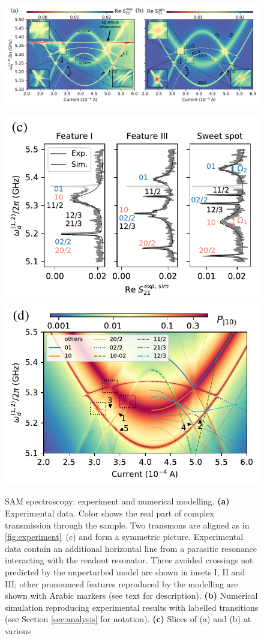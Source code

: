 \documentclass[%
 aps, prx,
 amsmath,amssymb,
 reprint,%
superscriptaddress
]{revtex4-2}
\begin{document}
\begin{figure}
	
	\centering
	\includegraphics[width=\linewidth]{main_picture}
	
	\includegraphics[width=.495\linewidth]{main_picture_slices}
	\includegraphics[width=.495\linewidth]{stationary}
	\caption{SAM spectroscopy: experiment 
	and numerical modelling. \textbf{(a)} 
	Experimental data. Color shows the real part 
	of complex transmission  through the sample. 
	Two transmons are aligned as in 
	\autoref{fig:experiment}~(c) and form a 
	symmetric picture. Experimental data contain 
	an additional horizontal line from a 
	parasitic resonance interacting with the 
	readout resonator. Three avoided crossings 
	not predicted by the unperturbed model are 
	shown in insets I, II and III; other 
	pronounced features reproduced by the 
	modelling are shown with Arabic markers (see 
	text for description). \textbf{(b)} Numerical 
	simulation reproducing experimental results 
	with labelled transitions (see Section 
	\ref{sec:analysis} for notation). 
	\textbf{(c)} Slices of (a) and (b) at various 
}
\end{figure}
\end{document}
